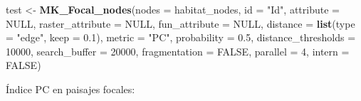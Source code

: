 \documentclass[
]{book}
\newenvironment{Shaded}{\begin{snugshade}}{\end{snugshade}}
\newcommand{\AttributeTok}[1]{\textcolor[rgb]{0.13,0.29,0.53}{#1}}
\newcommand{\ConstantTok}[1]{\textcolor[rgb]{0.56,0.35,0.01}{#1}}
\newcommand{\DecValTok}[1]{\textcolor[rgb]{0.00,0.00,0.81}{#1}}
\newcommand{\FloatTok}[1]{\textcolor[rgb]{0.00,0.00,0.81}{#1}}
\newcommand{\FunctionTok}[1]{\textcolor[rgb]{0.13,0.29,0.53}{\textbf{#1}}}
\newcommand{\NormalTok}[1]{#1}
\newcommand{\OtherTok}[1]{\textcolor[rgb]{0.56,0.35,0.01}{#1}}
\newcommand{\StringTok}[1]{\textcolor[rgb]{0.31,0.60,0.02}{#1}}
\begin{document}
\begin{Shaded}
\begin{Highlighting}[]
\NormalTok{test }\OtherTok{\textless{}{-}} \FunctionTok{MK\_Focal\_nodes}\NormalTok{(}\AttributeTok{nodes =}\NormalTok{ habitat\_nodes,}
                       \AttributeTok{id =} \StringTok{"Id"}\NormalTok{,}
                       \AttributeTok{attribute =} \ConstantTok{NULL}\NormalTok{,}
                       \AttributeTok{raster\_attribute =} \ConstantTok{NULL}\NormalTok{,}
                       \AttributeTok{fun\_attribute =} \ConstantTok{NULL}\NormalTok{,}
                       \AttributeTok{distance =} \FunctionTok{list}\NormalTok{(}\AttributeTok{type =} \StringTok{"edge"}\NormalTok{, }\AttributeTok{keep =} \FloatTok{0.1}\NormalTok{),}
                       \AttributeTok{metric =} \StringTok{"PC"}\NormalTok{,}
                       \AttributeTok{probability =} \FloatTok{0.5}\NormalTok{,}
                       \AttributeTok{distance\_thresholds =} \DecValTok{10000}\NormalTok{,}
                       \AttributeTok{search\_buffer =} \DecValTok{20000}\NormalTok{,}
                       \AttributeTok{fragmentation =} \ConstantTok{FALSE}\NormalTok{,}
                       \AttributeTok{parallel =} \DecValTok{4}\NormalTok{,}
                       \AttributeTok{intern =} \ConstantTok{FALSE}\NormalTok{)}
\end{Highlighting}
\end{Shaded}

Índice PC en paisajes focales:
\end{document}
